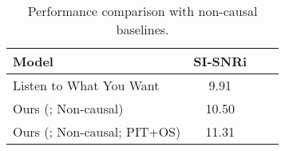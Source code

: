 \begin{table}
\label{non_causal}
\caption{{Performance comparison with non-causal baselines.}}
\vspace{-.8em}
\centering
\begin{tabular}{lccc}
\toprule
Model                   & SI-SNRi  \\
\midrule
Listen to What You Want \cite{2020arXiv200605712O} & 9.91 \\
Ours (; Non-causal) & 10.50 \\
Ours (; Non-causal; PIT+OS) & 11.31 \\
\bottomrule
\end{tabular}
\label{table:non_causal}
\vskip -0.15in
\end{table}